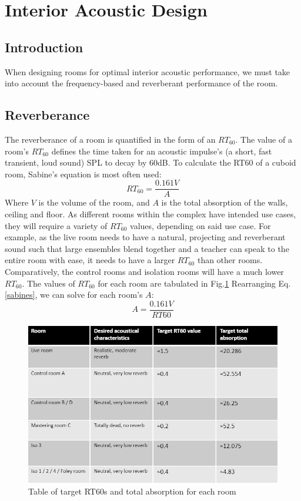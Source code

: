 \documentclass[10pt, twocolumn]{article}
\begin{document}
    \section{Interior Acoustic Design}
        \subsection{Introduction}
            When designing rooms for optimal interior acoustic performance, we must take into account the frequency-based and reverberant performance of the room.
        \subsection{Reverberance}
            The reverberance of a room is quantified in the form of an $RT_{60}$.
            The value of a room's $RT_{60}$ defines the time taken for an acoustic impulse's (a short, fast transient, loud sound) SPL to decay by 60dB.
            To calculate the RT60 of a cuboid room, Sabine's equation is most often used:
            \begin{equation}\label{sabines}
                RT_{60} = \frac{0.161 V}{A}
            \end{equation}
            Where $V$ is the volume of the room, and $A$ is the total absorption of the walls, ceiling and floor.
            As different rooms within the complex have intended use cases, they will require a variety of $RT_{60}$ values, depending on said use case.
            For example, as the live room needs to have a natural, projecting and reverberant sound such that large ensembles blend together and a teacher can speak to the entire room with ease, it needs to have a larger $RT_{60}$ than other rooms.
            Comparatively, the control rooms and isolation rooms will have a much lower $RT_{60}$.
            The values of $RT_{60}$ for each room are tabulated in Fig.\ref{RT60}
            Rearranging Eq.\ref{sabines}, we can solve for each room's $A$:
            \begin{equation}
                A = \frac{0.161V}{RT60} 
            \end{equation}
            \begin{figure}[H]
                \centering
                \includegraphics[scale=0.48]{resources/RT60.png}
                \caption{Table of target RT60s and total absorption for each room}
                \label{RT60}
            \end{figure}
\end{document}
